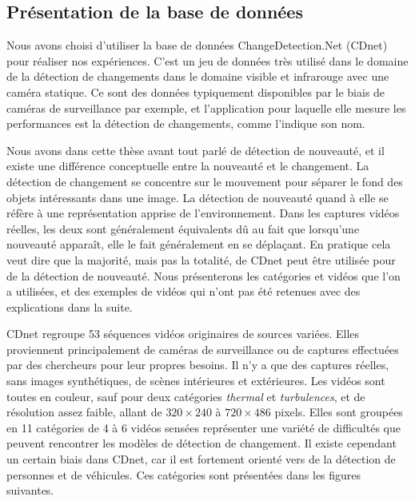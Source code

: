 	\subsection{Présentation de la base de données}

	Nous avons choisi d'utiliser la base de données ChangeDetection.Net (CDnet) \cite{wang-cdnet} pour réaliser nos expériences. C'est un jeu de données très utilisé dans le domaine de la détection de changements dans le domaine visible et infrarouge avec une caméra statique. Ce sont des données typiquement disponibles par le biais de caméras de surveillance par exemple, et l'application pour laquelle elle mesure les performances est la détection de changements, comme l'indique son nom.

	Nous avons dans cette thèse avant tout parlé de détection de nouveauté, et il existe une différence conceptuelle entre la nouveauté et le changement. La détection de changement se concentre sur le mouvement pour séparer le fond des objets intéressants dans une image. La détection de nouveauté quand à elle se réfère à une représentation apprise de l'environnement. Dans les captures vidéos réelles, les deux sont généralement équivalents dû au fait que lorsqu'une nouveauté apparaît, elle le fait généralement en se déplaçant. En pratique cela veut dire que la majorité, mais pas la totalité, de CDnet peut être utilisée pour de la détection de nouveauté. Nous présenterons les catégories et vidéos que l'on a utilisées, et des exemples de vidéos qui n'ont pas été retenues avec des explications dans la suite.
	
	CDnet regroupe 53 séquences vidéos originaires de sources variées. Elles proviennent principalement de caméras de surveillance ou de captures effectuées par des chercheurs pour leur propres besoins. Il n'y a que des captures réelles, sans images synthétiques, de scènes intérieures et extérieures. Les vidéos sont toutes en couleur, sauf pour deux catégories \textit{thermal} et \textit{turbulences}, et de résolution assez faible, allant de $320 \times 240$ à $720 \times 486$ pixels. Elles sont groupées en 11 catégories de 4 à 6 vidéos sensées représenter une variété de difficultés que peuvent rencontrer les modèles de détection de changement. Il existe cependant un certain biais dans CDnet, car il est fortement orienté vers de la détection de personnes et de véhicules. Ces catégories sont présentées dans les figures suivantes.

